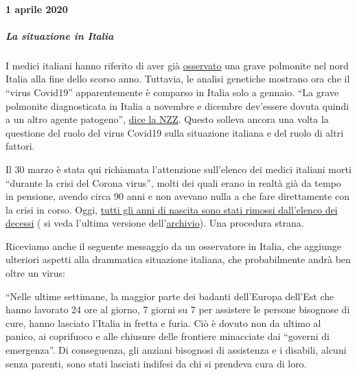 \hypertarget{1-aprile-2020}{%
\paragraph{1 aprile 2020}\label{1-aprile-2020}}

\hypertarget{la-situazione-in-italia}{%
\subparagraph{\texorpdfstring{\textbf{La situazione in
Italia}}{La situazione in Italia}}\label{la-situazione-in-italia}}

I medici italiani hanno riferito di aver già
\href{https://www.scmp.com/news/china/society/article/3076334/coronavirus-strange-pneumonia-seen-lombardy-november-leading}{osservato}
una grave polmonite nel nord Italia alla fine dello scorso anno.
Tuttavia, le analisi genetiche mostrano ora che il ``virus Covid19''
apparentemente è comparso in Italia solo a gennaio. ``La grave polmonite
diagnosticata in Italia a novembre e dicembre dev'essere dovuta quindi a
un altro agente patogeno'',
\href{https://www.nzz.ch/wissenschaft/coronavirus-der-stammbaum-verraet-woher-es-kommt-ld.1548271}{dice
la NZZ}. Questo solleva ancora una volta la questione del ruolo del
virus Covid19 sulla situazione italiana e del ruolo di altri fattori.

Il 30 marzo è stata qui richiamata l'attenzione sull'elenco dei medici
italiani morti ``durante la crisi del Corona virus'', molti dei quali
erano in realtà già da tempo in pensione, avendo circa 90 anni e non
avevano nulla a che fare direttamente con la crisi in corso. Oggi,
\href{https://portale.fnomceo.it/elenco-dei-medici-caduti-nel-corso-dellepidemia-di-covid-19/}{tutti
gli anni di nascita sono stati rimossi dall'elenco dei decessi} ( si
veda l'ultima versione
dell'\href{https://web.archive.org/web/20200328152430/https://portale.fnomceo.it/elenco-dei-medici-caduti-nel-corso-dellepidemia-di-covid-19/}{archivio}).
Una procedura strana.

Riceviamo anche il seguente messaggio da un osservatore in Italia, che
aggiunge ulteriori aspetti alla drammatica situazione italiana, che
probabilmente andrà ben oltre un virus:

``Nelle ultime settimane, la maggior parte dei badanti dell'Europa
dell'Est che hanno lavorato 24 ore al giorno, 7 giorni su 7 per
assistere le persone bisognose di cure, hanno lasciato l'Italia in
fretta e furia. Ciò è dovuto non da ultimo al panico, ai coprifuoco e
alle chiusure delle frontiere minacciate dai ``governi di emergenza''.
Di conseguenza, gli anziani bisognosi di assistenza e i disabili, alcuni
senza parenti, sono stati lasciati indifesi da chi si prendeva cura di
loro.

